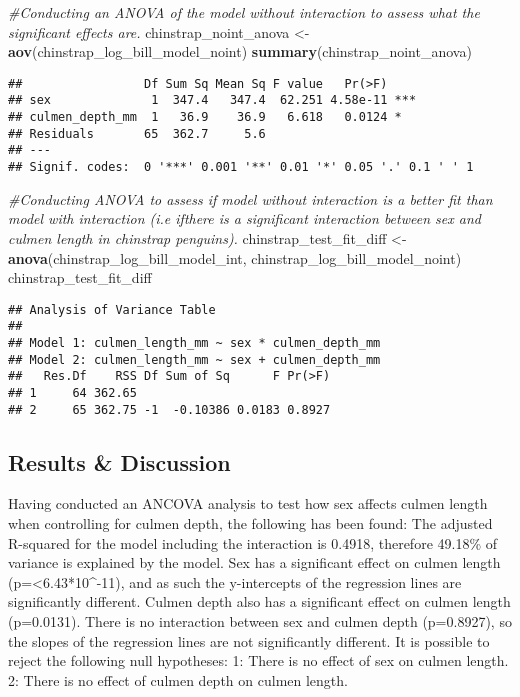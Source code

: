 \documentclass[
]{article}
\newenvironment{Shaded}{\begin{snugshade}}{\end{snugshade}}
\newcommand{\CommentTok}[1]{\textcolor[rgb]{0.56,0.35,0.01}{\textit{#1}}}
\newcommand{\FunctionTok}[1]{\textcolor[rgb]{0.13,0.29,0.53}{\textbf{#1}}}
\newcommand{\NormalTok}[1]{#1}
\newcommand{\OtherTok}[1]{\textcolor[rgb]{0.56,0.35,0.01}{#1}}
\begin{document}
\begin{Shaded}
\begin{Highlighting}[]
\CommentTok{\#Conducting an ANOVA of the model without interaction to assess what the significant effects are.}
\NormalTok{chinstrap\_noint\_anova }\OtherTok{\textless{}{-}} \FunctionTok{aov}\NormalTok{(chinstrap\_log\_bill\_model\_noint)}
\FunctionTok{summary}\NormalTok{(chinstrap\_noint\_anova)}
\end{Highlighting}
\end{Shaded}

\begin{verbatim}
##                 Df Sum Sq Mean Sq F value   Pr(>F)    
## sex              1  347.4   347.4  62.251 4.58e-11 ***
## culmen_depth_mm  1   36.9    36.9   6.618   0.0124 *  
## Residuals       65  362.7     5.6                     
## ---
## Signif. codes:  0 '***' 0.001 '**' 0.01 '*' 0.05 '.' 0.1 ' ' 1
\end{verbatim}

\begin{Shaded}
\begin{Highlighting}[]
\CommentTok{\#Conducting ANOVA to assess if model without interaction is a better fit than model with interaction (i.e ifthere is a significant interaction between sex and culmen length in chinstrap penguins).}
\NormalTok{chinstrap\_test\_fit\_diff }\OtherTok{\textless{}{-}} \FunctionTok{anova}\NormalTok{(chinstrap\_log\_bill\_model\_int, chinstrap\_log\_bill\_model\_noint)}
\NormalTok{chinstrap\_test\_fit\_diff}
\end{Highlighting}
\end{Shaded}

\begin{verbatim}
## Analysis of Variance Table
## 
## Model 1: culmen_length_mm ~ sex * culmen_depth_mm
## Model 2: culmen_length_mm ~ sex + culmen_depth_mm
##   Res.Df    RSS Df Sum of Sq      F Pr(>F)
## 1     64 362.65                           
## 2     65 362.75 -1  -0.10386 0.0183 0.8927
\end{verbatim}

\subsection{Results \& Discussion}\label{results-discussion}

Having conducted an ANCOVA analysis to test how sex affects culmen
length when controlling for culmen depth, the following has been found:
The adjusted R-squared for the model including the interaction is
0.4918, therefore 49.18\% of variance is explained by the model. Sex has
a significant effect on culmen length (p=\textless6.43*10\^{}-11), and
as such the y-intercepts of the regression lines are significantly
different. Culmen depth also has a significant effect on culmen length
(p=0.0131). There is no interaction between sex and culmen depth
(p=0.8927), so the slopes of the regression lines are not significantly
different. It is possible to reject the following null hypotheses: 1:
There is no effect of sex on culmen length. 2: There is no effect of
culmen depth on culmen length.
\end{document}

